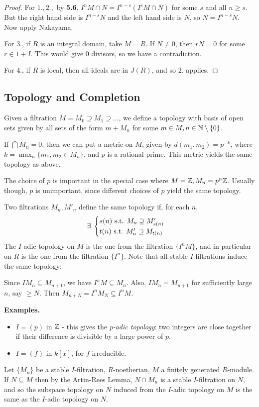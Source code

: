\documentclass[10pt,a4paper]{article}
\begin{document}
\begin{proof}
  For $1., 2.,$ by \textbf{5.6}, $I^n M \cap N = I^{n-s}(I^s M \cap N)$ for some $s$ and all $n \geq s$. But the right hand side is $I^{n-s}N$ and the left hand side is $N$, so $N = I^{n-s}N$. Now apply Nakayama.

  For $3.$, if $R$ is an integral domain, take $M=R$. If $N \neq 0$, then $rN = 0$ for some $r \in 1+I$. This would give 0 divisors, so we have a contradiction.

  For $4.$, if $R$ is local, then all ideals are in $J(R)$, and so $2.$ applies.
\end{proof}
\subsection{Topology and Completion}
Given a filtration $M = M_0 \supseteq M_1 \supseteq \ldots$, we define a topology with basis of open sets given by all sets of the form $m + M_n$ for some $m \in M, n \in \mathbb{N} \setminus\{0\}$.

If $\bigcap M_n = 0$, then we can put a metric on $M$, given by $d(m_1, m_2) = p^{-k}$, where $k = \max_n \{m_1, m_2 \in M_n\}$, and $p$ is a rational prime. This metric yields the same topology as above.

The choice of $p$ is important in the special case where $M = \mathbb{Z}, M_n = p^n \mathbb{Z}$. Usually though, $p$ is unimportant, since different choices of $p$ yield the same topology.

Two filtrations $M_n, M'_n$ define the same topology if, for each $n$,
\[\exists \begin{cases} s(n) \st M_n \supseteq M'_{s(n)} \\ t(n) \st M_n' \supseteq M_{t(n)} \end{cases}\]
The $I$-adic topology on $M$ is the one from the filtration $\{I^nM\}$, and in particular on $R$ is the one from the filtration $\{I^n\}$. Note that all stable $I$-filtrations induce the same topology:

Since $IM_n \subseteq M_{n+1}$, we have $I^nM\subseteq M_n$. Also, $IM_n = M_{n+1}$ for sufficiently large $n$, say $\geq N$. Then $M_{n+N} = I^nM_N \subseteq I^nM$.

\textbf{Examples.}
\begin{itemize}
  \item $I = (p)$ in $\mathbb{Z}$ - this gives the \emph{p-adic topology}: two integers are close together if their difference is divisible by a large power of $p$.
  \item $I = (f)$ in $k[x]$, for $f$ irreducible.
\end{itemize}
Let $\{M_n\}$ be a stable $I$-filtration, $R$-noetherian, $M$ a finitely generated $R$-module. If $N\subseteq M$ then by the Artin-Rees Lemma, $N \cap M_n$ is a stable $I$-filtration on $N$, and so the subspace topology on $N$ induced from the $I$-adic topology on $M$ is the same as the $I$-adic topology on $N$.
\end{document}
